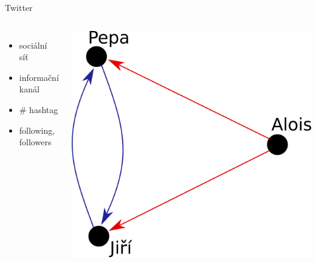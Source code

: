 \documentclass[notheorems,12pt]{beamer}
\begin{document}
\begin{frame}{Twitter}
    \begin{columns}
    \column{5cm}
    	\begin{itemize}
    		\item sociální síť
    		\item informační kanál
    		\item \# hashtag
    		\item following, followers
    	\end{itemize}
    \column{6cm}
    	\center
    	\includegraphics[scale=0.35]{./Pics/pepa.png}
    \end{columns}
\end{frame}
\end{document}
